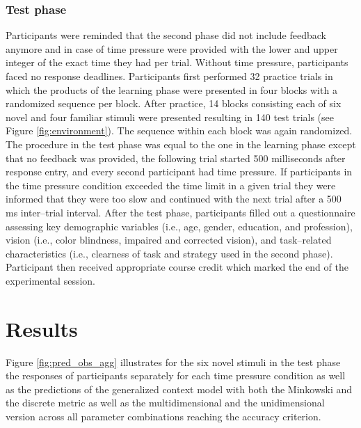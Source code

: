 \documentclass[a4paper,man,natbib]{apa6}
\begin{document}
\subsubsection{Test phase}
Participants were reminded that the second phase did not include feedback anymore and in case of time pressure were provided with the lower and upper integer of the exact time they had per trial. Without time pressure, participants faced no response deadlines. Participants first performed 32 practice trials in which the products of the learning phase were presented in four blocks with a randomized sequence per block. After practice, 14 blocks consisting each of six novel and four familiar stimuli were presented resulting in 140 test trials (see Figure \ref{fig:environment}). The sequence within each block was again randomized. The procedure in the test phase was equal to the one in the learning phase except that no feedback was provided, the following trial started 500 milliseconds after response entry, and every second participant had time pressure. If participants in the time pressure condition exceeded the time limit in a given trial they were informed that they were too slow and continued with the next trial after a 500 ms inter--trial interval. After the test phase, participants filled out a questionnaire assessing key demographic variables (i.e., age, gender, education, and profession), vision (i.e., color blindness, impaired and corrected vision), and task--related characteristics (i.e., clearness of task and strategy used in the second phase). Participant then received appropriate course credit which marked the end of the experimental session.

\section{Results}
Figure \ref{fig:pred_obs_agg} illustrates for the six novel stimuli in the test phase the responses of participants separately for each time pressure condition as well as the predictions of the generalized context model with both the Minkowski and the discrete metric as well as the multidimensional and the unidimensional version across all parameter combinations reaching the accuracy criterion.
\end{document}
